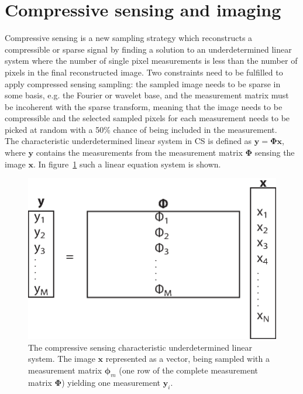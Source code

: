 \section{Compressive sensing and imaging}
Compressive sensing is a new sampling strategy which reconstructs a compressible or sparse signal by finding a solution to an underdetermined linear system where the number of single pixel measurements is less than the number of pixels in the final reconstructed image. Two constraints need to be fulfilled to apply compressed sensing sampling: the sampled image needs to be sparse in some basis, e.g. the Fourier or wavelet base, and the measurement matrix must be incoherent with the sparse transform, meaning that the image needs to be compressible and the selected sampled pixels for each measurement needs to be picked at random with a 50\% chance of being included in the measurement.\cite{article:CS_donoho1} \\[0.1in]

The characteristic  underdetermined linear system in CS is defined as $ \mathbf{y} = \mathbf{\Phi}\mathbf{x}$, where $\mathbf{y}$ contains the measurements from the measurement matrix $\mathbf{\Phi}$ sensing the image $\mathbf{x}$. In figure~\ref{fig:CS_eq_sys} such a linear equation system is shown.

\begin{figure}[H]
	\centering
	\includegraphics[scale=0.5]{gfx/CS_eq.eps}
	\caption{The compressive sensing characteristic underdetermined linear system. The image $\mathbf{x}$ represented as a vector, being sampled with a measurement matrix $\mathbf{\phi}_m$ (one row of the complete measurement matrix $\mathbf{\Phi}$) yielding one measurement $\mathbf{y}_i$.}
	\label{fig:CS_eq_sys}
\end{figure}


